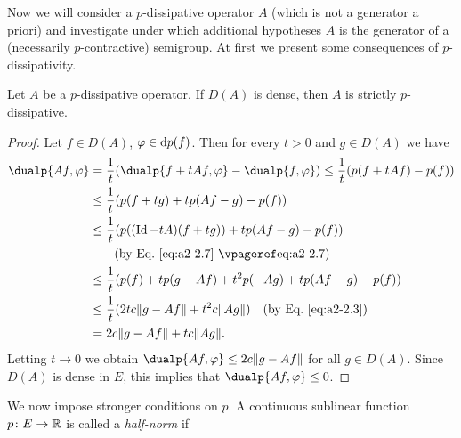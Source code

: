 Now we will consider a $p$-dissipative operator $A$ (which is not a generator a priori) and investigate under which additional hypotheses $A$ is the generator of a (necessarily $p$-contractive) semigroup.
At first we present some consequences of $p$-dissipativity.
\begin{theorem}\label{thm:a2-2.7}
Let $A$ be a $p$-dissipative operator.
If\/ $D(A)$ is dense, then $A$ is strictly $p$-dissipative.
\end{theorem}
\begin{proof}
Let $f \in D(A)$, $\phi \in \ddp(f)$.
Then for every $t > 0$ and $g \in D(A)$ we have
\begin{align*}
\dualp{Af,\phi} 
&= \frac{1}{t}(\dualp{f + tAf,\phi} - \dualp{f,\phi}) \leq \frac{1}{t}(p(f + tAf) - p(f)) \\
&\leq \frac{1}{t}(p(f + tg) + tp(Af - g) - p(f)) \\
&\leq \frac{1}{t}(p((\Id - tA)(f + tg)) + tp(Af - g) - p(f)) \\
&\qquad \text{(by Eq.~\myeqpageref{eq:a2-2.7})} \\
&\leq \frac{1}{t}(p(f) + tp(g - Af) + t^2p(-Ag) + tp(Af - g) - p(f)) \\
&\leq \frac{1}{t}(2tc\|g - Af\| + t^2c\|Ag\|) \quad \text{(by Eq.~\eqref{eq:a2-2.3})} \\
&= 2c\|g - Af\| + tc\|Ag\|.
\end{align*}
Letting $t \to 0$ we obtain $\dualp{Af,\phi} \leq 2c\|g - Af\|$ for all $g \in D(A)$.
Since $D(A)$ is dense in $E$, this implies that $\dualp{Af,\phi} \leq 0$.
\end{proof}
We now impose stronger conditions on $p$.
A continuous sublinear function $p \colon E \to \mathbb{R}$ is called a \emph{half-norm} if
